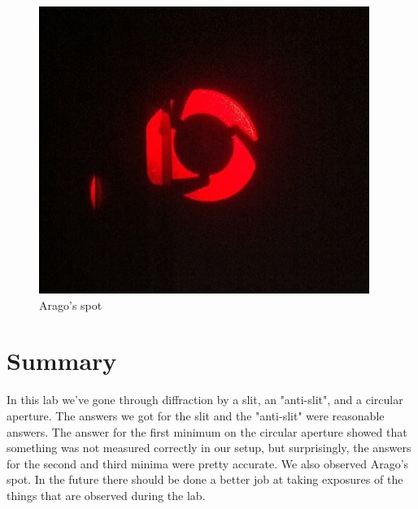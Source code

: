 \documentclass[a4paper,12pt]{article}
\begin{document}
\begin{figure}
	\centering
	\includegraphics[width=\textwidth]{arago}
	\caption{Arago's spot}\label{fig:arago}
\end{figure}

\section{Summary}
In this lab we've gone through diffraction by a slit, an "anti-slit", and a circular aperture. The answers we got for the slit and the "anti-slit" were reasonable answers. The answer for the first minimum on the circular aperture showed that something was not measured correctly in our setup, but surprisingly, the answers for the second and third minima were pretty accurate. We also observed Arago's spot. In the future there should be done a better job at taking exposures of the things that are observed during the lab.
\end{document}
